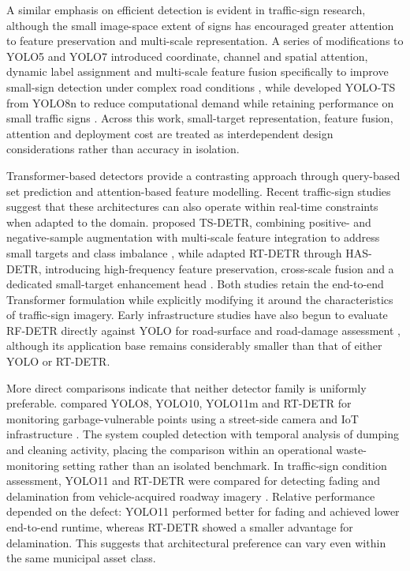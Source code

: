 A similar emphasis on efficient detection is evident in traffic-sign research, although the small image-space extent of signs has encouraged greater attention to feature preservation and multi-scale representation. A series of modifications to \gls{YOLO}5 and \gls{YOLO}7 introduced coordinate, channel and spatial attention, dynamic label assignment and multi-scale feature fusion specifically to improve small-sign detection under complex road conditions \cite{wang2023improvedtrafficsign,shi2023scyolo,mahadshetti2024signyolo}, while \citeauthor{liu2024yolots} developed YOLO-TS from \gls{YOLO}8n to reduce computational demand while retaining performance on small traffic signs \cite{liu2024yolots}. Across this work, small-target representation, feature fusion, attention and deployment cost are treated as interdependent design considerations rather than accuracy in isolation.

Transformer-based detectors provide a contrasting approach through query-based set prediction and attention-based feature modelling. Recent traffic-sign studies suggest that these architectures can also operate within real-time constraints when adapted to the domain. \citeauthor{lin2025tsdetr} proposed TS-DETR, combining positive- and negative-sample augmentation with multi-scale feature integration to address small targets and class imbalance \cite{lin2025tsdetr}, while \citeauthor{dong2026hasdetr} adapted \gls{RT-DETR} through HAS-DETR, introducing high-frequency feature preservation, cross-scale fusion and a dedicated small-target enhancement head \cite{dong2026hasdetr}. Both studies retain the end-to-end Transformer formulation while explicitly modifying it around the characteristics of traffic-sign imagery. Early infrastructure studies have also begun to evaluate \gls{RF-DETR} directly against \gls{YOLO} for road-surface and road-damage assessment \cite{kurrey2026roadsurface,amores2026roaddamage}, although its application base remains considerably smaller than that of either \gls{YOLO} or \gls{RT-DETR}.

More direct comparisons indicate that neither detector family is uniformly preferable. \citeauthor{kumar2026gvp} compared \gls{YOLO}8, \gls{YOLO}10, \gls{YOLO}11m and \gls{RT-DETR} for monitoring garbage-vulnerable points using a street-side camera and \gls{IoT} infrastructure \cite{kumar2026gvp}. The system coupled detection with temporal analysis of dumping and cleaning activity, placing the comparison within an operational waste-monitoring setting rather than an isolated benchmark. In traffic-sign condition assessment, \gls{YOLO}11 and \gls{RT-DETR} were compared for detecting fading and delamination from vehicle-acquired roadway imagery \cite{pandey2026signcondition}. Relative performance depended on the defect: \gls{YOLO}11 performed better for fading and achieved lower end-to-end runtime, whereas \gls{RT-DETR} showed a smaller advantage for delamination. This suggests that architectural preference can vary even within the same municipal asset class.

